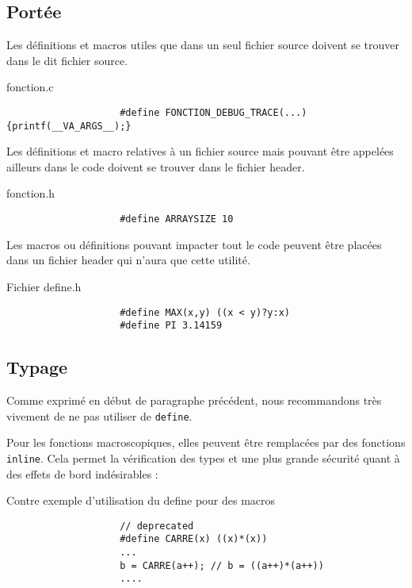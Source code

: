 		\subsection{Portée}
			Les définitions et macros utiles que dans un seul fichier source doivent se trouver dans le dit fichier source.

			\begin{cbox}{fonction.c}
				\begin{verbatim}
					#define FONCTION_DEBUG_TRACE(...) {printf(__VA_ARGS__);}
				\end{verbatim}
			\end{cbox}

			Les définitions et macro relatives à un fichier source mais pouvant être appelées ailleurs dans le code doivent se trouver dans le fichier header.

			\begin{cbox}{fonction.h}
				\begin{verbatim}
					#define ARRAYSIZE 10
				\end{verbatim}
			\end{cbox}

			Les macros ou définitions pouvant impacter tout le code peuvent être placées dans un fichier header qui n'aura que cette utilité.
			
			\begin{cbox}{Fichier define.h}
				\begin{verbatim}
					#define MAX(x,y) ((x < y)?y:x)
					#define PI 3.14159
				\end{verbatim}
			\end{cbox}

		\subsection{Typage}
			Comme exprimé en début de paragraphe précédent, nous recommandons très vivement de ne pas utiliser de \verb+define+.

			Pour les fonctions macroscopiques, elles peuvent être remplacées par des fonctions \verb+inline+. Cela permet la vérification des types et une plus grande sécurité quant à des effets de bord indésirables :

			\begin{cbox}{Contre exemple d'utilisation du define pour des macros}
				\begin{verbatim}
					// deprecated
					#define CARRE(x) ((x)*(x))
					...
					b = CARRE(a++); // b = ((a++)*(a++))
					....
				\end{verbatim}
			\end{cbox}

